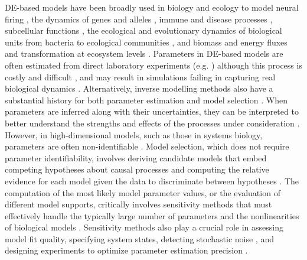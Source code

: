 DE-based models have been broadly used in biology and ecology to model neural firing \cite{hodgkin1952quantitative}, the dynamics of genes and alleles \cite{Page2002}, immune and disease processes \cite{colijn2006high}, subcellular functions \cite{brown2003statistical}, the ecological and evolutionary dynamics of biological units from bacteria to ecological communities \cite{Gabor2015, Lion2018, Villa2021, Boussange2022, boussange2023a, Akesson2021, chalmandrier2021, VandenBerg2022}, and biomass and energy fluxes and transformation at ecosystem levels \cite{Weng2015, Schartau2017, Franklin2020, Geary2020}.
Parameters in DE-based models are often estimated from direct laboratory experiments (e.g. \cite{hodgkin1952quantitative}) although this process is costly and difficult \cite{Schartau2017}, and may result in simulations failing in capturing real biological dynamics \cite{Watts2001}. 
Alternatively, inverse modelling methods also have a substantial history for both parameter estimation \cite{ramsay2007parameter,ramsay2017dynamic,Schartau2017,ding2000h,fussmann2000crossing} and model selection \cite{Johnson2004,zhang2015selection,alsos2023,pantel2023}.
When parameters are inferred along with their uncertainties, they can be interpreted to better understand the strengths and effects of the processes under consideration \cite{Pontarp2019, Higgins2010, Curtsdotter2019, godwin2020}. 
However, in high-dimensional models, such as those in systems biology, parameters are often non-identifiable \cite{transtrum2011geometry}. 
Model selection, which does not require parameter identifiability, involves deriving candidate models that embed competing hypotheses about causal processes and computing the relative evidence for each model given the data to discriminate between hypotheses \cite{Johnson2004, alsos2023}.
The computation of the most likely model parameter values, or the evaluation of different model supports, critically involves sensitivity methods that must effectively handle the typically large number of parameters and the nonlinearities of biological models \cite{transtrum2011geometry, Gabor2015}.
Sensitivity methods also play a crucial role in assessing model fit quality, specifying system states, detecting stochastic noise \cite{hooker2009forcing, hooker2015goodness, liu2023specification}, and designing experiments to optimize parameter estimation precision \cite{bauer2000numerical}.

